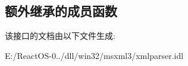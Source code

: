 \subsection*{额外继承的成员函数}


该接口的文档由以下文件生成\+:\begin{DoxyCompactItemize}
\item 
E\+:/\+React\+O\+S-\/0../dll/win32/msxml3/xmlparser.\+idl\end{DoxyCompactItemize}
